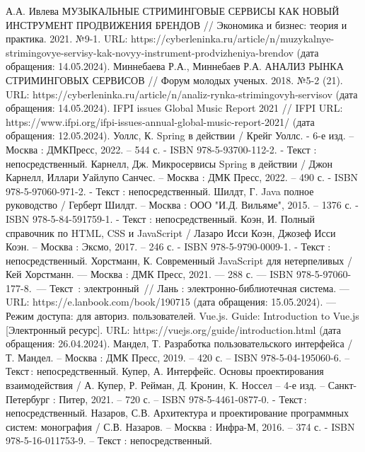 
\begin{thebibliography}{9}
     А.А. Ивлева МУЗЫКАЛЬНЫЕ СТРИМИНГОВЫЕ СЕРВИСЫ КАК НОВЫЙ ИНСТРУМЕНТ ПРОДВИЖЕНИЯ БРЕНДОВ // Экономика и бизнес: теория и практика. 2021. №9-1. URL: https://cyberleninka.ru/article/n/muzykalnye-strimingovye-servisy-kak-novyy-instrument-prodvizheniya-brendov (дата обращения: 14.05.2024).
	 Миннебаева Р.А., Миннебаев Р.А. АНАЛИЗ РЫНКА СТРИМИНГОВЫХ СЕРВИСОВ // Форум молодых ученых. 2018. №5-2 (21). URL: https://cyberleninka.ru/article/n/analiz-rynka-strimingovyh-servisov (дата обращения: 14.05.2024).
	 IFPI issues Global Music Report 2021 // IFPI URL: https://www.ifpi.org/ifpi-issues-annual-global-music-report-2021/ (дата обращения: 12.05.2024).
      Уоллс, К. Spring в действии / Крейг Уоллс. - 6-е изд. – Москва : ДМКПресс, 2022. – 544 с. - ISBN 978-5-93700-112-2. - Текст : непосредственный.
     Карнелл, Дж. Микросервисы Spring в действии / Джон Карнелл, Иллари Уайлупо Санчес. – Москва : ДМК Пресс, 2022. – 490 с. - ISBN 978-5-97060-971-2. - Текст : непосредственный.
     Шилдт, Г. Java полное руководство / Герберт Шилдт. – Москва : ООО "И.Д. Вильяме", 2015. – 1376 с. - ISBN 978-5-84-591759-1. - Текст : непосредственный.
     Коэн, И. Полный справочник по HTML, CSS и JavaScript / Лазаро Исси Коэн, Джозеф Исси Коэн. – Москва : Эксмо, 2017. – 246 с. - ISBN 978-5-9790-0009-1. - Текст : непосредственный.
     Хорстманн, К. Современный JavaScript для нетерпеливых / Кей Хорстманн. — Москва : ДМК Пресс, 2021. — 288 с. — ISBN 978-5-97060-177-8. — Текст : электронный // Лань : электронно-библиотечная система. — URL: https://e.lanbook.com/book/190715 (дата обращения: 15.05.2024). — Режим доступа: для авториз. пользователей.
     Vue.js. Guide: Introduction to Vue.js [Электронный ресурс]. URL: https://vuejs.org/guide/introduction.html (дата обращения: 26.04.2024).
     Мандел, Т. Разработка пользовательского интерфейса / Т. Мандел. – Москва : ДМК Пресс, 2019. – 420 с. – ISBN 978-5-04-195060-6. – Текст : непосредственный.
     Купер, А. Интерфейс. Основы проектирования взаимодействия / А. Купер, Р. Рейман, Д. Кронин, К. Носсел – 4-е изд. – Санкт-Петербург : Питер, 2021. – 720 с. – ISBN 978-5-4461-0877-0. - Текст : непосредственный.
     Назаров, С.В. Архитектура и проектирование программных систем: монография / С.В. Назаров. – Москва : Инфра-М, 2016. – 374 с. - ISBN 978-5-16-011753-9. – Текст : непосредственный.

\end{thebibliography}
